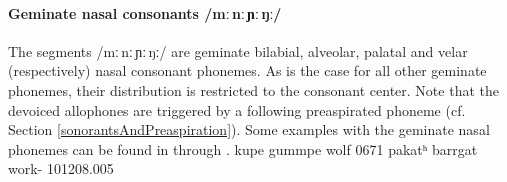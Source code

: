 \paragraph{Geminate nasal consonants /mː\,nː\,ɲː\,ŋː/}
The segments /mː\,nː\,ɲː\,ŋː/ are geminate bilabial, alveolar, palatal and velar (respectively) nasal consonant phonemes. 
As is the case for all other geminate phonemes, their distribution is restricted to the consonant center. 
Note that the devoiced allophones are triggered by a following preaspirated phoneme (cf. Section \ref{sonorantsAndPreaspiration}). 
Some examples with the geminate nasal phonemes can be found in  through .
	{kupe}	{gummpe}	{wolf\BS{}}		{0671}
	{pakatʰ}	{barrgat}	{work-}			{101208}{.005}



